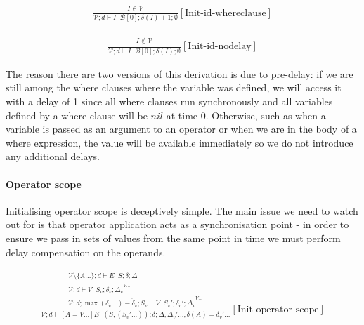 \documentclass{scrartcl}
\DeclareMathOperator{\initrel}{\overset{init}{\Rightarrow}}
\DeclareMathOperator{\comprel}{\overset{compensate}{\Rightarrow}}
\begin{document}
    \begin{align*}
    \frac{
        \begin{matrix}
        I \in \mathcal{V}
        \end{matrix}
    }{
        \mathcal{V}; d \vdash I \initrel \mathcal{B}[0]; \delta(I) + 1; \emptyset
    }[\text{Init-id-whereclause}]
    \end{align*}
    
    \begin{align*}
    \frac{
        \begin{matrix}
        I \notin \mathcal{V}
        \end{matrix}
    }{
        \mathcal{V}; d \vdash I \initrel \mathcal{B}[0]; \delta(I); \emptyset
    }[\text{Init-id-nodelay}]
    \end{align*}
    
    The reason there are two versions of this derivation is due to pre-delay: if we are still among the where clauses where the variable was defined, we will access it with a delay of 1 since all where clauses run synchronously and all variables defined by a where clause will be $nil$ at time 0. Otherwise, such as when a variable is passed as an argument to an operator or when we are in the body of a where expression, the value will be available immediately so we do not introduce any additional delays.
    
    \paragraph{Operator scope}
    
    Initialising operator scope is deceptively simple. The main issue we need to watch out for is that operator application acts as a synchronisation point - in order to ensure we pass in sets of values from the same point in time we must perform delay compensation on the operands.
    
    \begin{align*}
    \frac{
        \begin{matrix}
        \mathcal{V} \setminus \{A...\}; d \vdash E \initrel S; \delta; \Delta \\
        \overline{\mathcal{V}; d \vdash V \initrel S_v; \delta_v; \Delta_v}^{V...} \\
        \overline{\mathcal{V}; d; \max(\delta_v...) - \delta_v; S_v \vdash V \comprel S_v'; \delta_v'; \Delta_v}^{V...}
        \end{matrix}
    }{
        \mathcal{V}; d \vdash [A=V...]E \initrel (S, (S_v'...)); \delta; \Delta, \Delta_v'..., \delta(A)=\delta_v'...
    }[\text{Init-operator-scope}]
    \end{align*}
    
\end{document}
